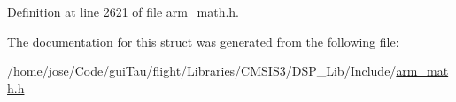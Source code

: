 Definition at line 2621 of file arm\-\_\-math.\-h.



The documentation for this struct was generated from the following file\-:\begin{DoxyCompactItemize}
\item 
/home/jose/\-Code/gui\-Tau/flight/\-Libraries/\-C\-M\-S\-I\-S3/\-D\-S\-P\-\_\-\-Lib/\-Include/\hyperlink{arm__math_8h}{arm\-\_\-math.\-h}\end{DoxyCompactItemize}
